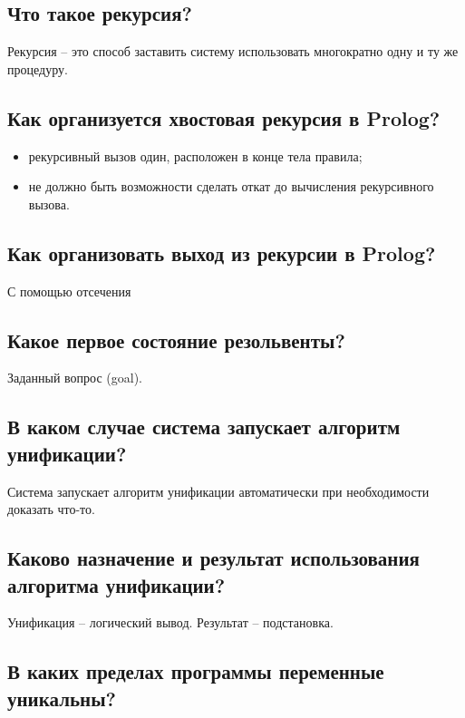 \subsection*{Что такое рекурсия?}

Рекурсия – это способ заставить систему
использовать многократно одну и ту же процедуру.

\subsection*{Как организуется хвостовая рекурсия в Prolog?}

\begin{itemize}
    \item рекурсивный вызов один, расположен в конце тела правила;
    \item не должно быть возможности сделать откат до вычисления рекурсивного вызова.
\end{itemize}

\subsection*{Как организовать выход из рекурсии в Prolog?}

С помощью отсечения

\subsection*{Какое первое состояние резольвенты?}

Заданный вопрос (goal).

\subsection*{В каком случае система запускает алгоритм унификации?}

Система запускает алгоритм унификации автоматически при необходимости доказать что-то.

\subsection*{Каково назначение и результат использования алгоритма унификации?}

Унификация – логический вывод. Результат – подстановка.

\subsection*{В каких пределах программы переменные уникальны?}

